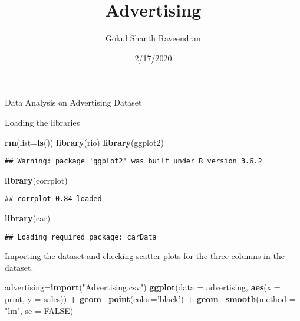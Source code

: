 \documentclass[
]{article}
\title{Advertising}
\author{Gokul Shanth Raveendran}
\date{2/17/2020}
\newenvironment{Shaded}{\begin{snugshade}}{\end{snugshade}}
\newcommand{\DataTypeTok}[1]{\textcolor[rgb]{0.13,0.29,0.53}{#1}}
\newcommand{\KeywordTok}[1]{\textcolor[rgb]{0.13,0.29,0.53}{\textbf{#1}}}
\newcommand{\NormalTok}[1]{#1}
\newcommand{\OperatorTok}[1]{\textcolor[rgb]{0.81,0.36,0.00}{\textbf{#1}}}
\newcommand{\OtherTok}[1]{\textcolor[rgb]{0.56,0.35,0.01}{#1}}
\newcommand{\StringTok}[1]{\textcolor[rgb]{0.31,0.60,0.02}{#1}}
\begin{document}
\maketitle

Data Analysis on Advertising Dataset

Loading the libraries

\begin{Shaded}
\begin{Highlighting}[]
\KeywordTok{rm}\NormalTok{(}\DataTypeTok{list=}\KeywordTok{ls}\NormalTok{())}
\KeywordTok{library}\NormalTok{(rio)}
\KeywordTok{library}\NormalTok{(ggplot2) }
\end{Highlighting}
\end{Shaded}

\begin{verbatim}
## Warning: package 'ggplot2' was built under R version 3.6.2
\end{verbatim}

\begin{Shaded}
\begin{Highlighting}[]
\KeywordTok{library}\NormalTok{(corrplot)}
\end{Highlighting}
\end{Shaded}

\begin{verbatim}
## corrplot 0.84 loaded
\end{verbatim}

\begin{Shaded}
\begin{Highlighting}[]
\KeywordTok{library}\NormalTok{(car)}
\end{Highlighting}
\end{Shaded}

\begin{verbatim}
## Loading required package: carData
\end{verbatim}

Importing the dataset and checking scatter plots for the three columns
in the dataset.

\begin{Shaded}
\begin{Highlighting}[]
\NormalTok{advertising=}\KeywordTok{import}\NormalTok{(}\StringTok{"Advertising.csv"}\NormalTok{)}
\KeywordTok{ggplot}\NormalTok{(}\DataTypeTok{data =}\NormalTok{ advertising, }\KeywordTok{aes}\NormalTok{(}\DataTypeTok{x =}\NormalTok{ print, }\DataTypeTok{y =}\NormalTok{ sales)) }\OperatorTok{+}\StringTok{ }
\StringTok{  }\KeywordTok{geom_point}\NormalTok{(}\DataTypeTok{color=}\StringTok{'black'}\NormalTok{) }\OperatorTok{+}
\StringTok{  }\KeywordTok{geom_smooth}\NormalTok{(}\DataTypeTok{method =} \StringTok{"lm"}\NormalTok{, }\DataTypeTok{se =} \OtherTok{FALSE}\NormalTok{)}
\end{Highlighting}
\end{Shaded}
\end{document}
